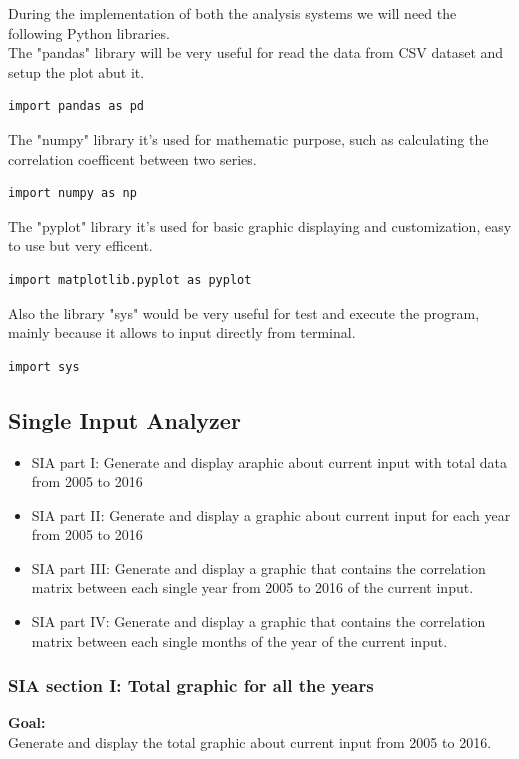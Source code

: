 During the implementation of both the analysis systems we will need the following Python libraries. \\

The "pandas" library will be very useful for read the data from CSV dataset and setup the plot abut it.
\begin{lstlisting}
import pandas as pd
\end{lstlisting}

The "numpy" library it's used for mathematic purpose, such as calculating the correlation coefficent between two series.
\begin{lstlisting}
import numpy as np
\end{lstlisting}
 
The "pyplot" library it's used for basic graphic displaying and customization, easy to use but very efficent.
\begin{lstlisting}
import matplotlib.pyplot as pyplot
\end{lstlisting}

Also the library "sys" would be very useful for test and execute the program, mainly because it allows to input directly from terminal.
\begin{lstlisting}
import sys
\end{lstlisting}

\newpage
\subsection{Single Input Analyzer}
\begin{itemize}
\item SIA part I: Generate and display araphic about current input with total data from 2005 to 2016
\item SIA part II: Generate and display a graphic about current input for each year from 2005 to 2016
\item SIA part III: Generate and display a graphic that contains the correlation matrix between each single year from 2005 to 2016 of the current input.
\item SIA part IV: Generate and display a graphic that contains the correlation matrix between each single months of the year of the current input.
\end{itemize}
\newpage
\subsubsection{SIA section I: Total graphic for all the years}
\textbf{Goal:}\\
Generate and display the total graphic about current input from 2005 to 2016.

